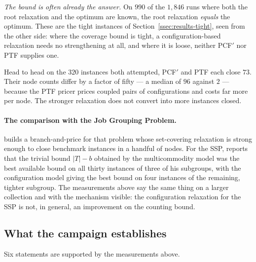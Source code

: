\emph{The bound is often already the answer.} On $990$ of the $1{,}846$ runs where both
the root relaxation and the optimum are known, the root relaxation \emph{equals} the
optimum. These are the tight instances of Section~\ref{ssec:results-tight}, seen from
the other side: where the coverage bound is tight, a configuration-based relaxation
needs no strengthening at all, and where it is loose, neither PCF$'$ nor PTF supplies
one.

Head to head on the $320$ instances both attempted, PCF$'$ and PTF each close $73$.
Their node counts differ by a factor of fifty --- a median of $96$ against $2$ ---
because the PTF pricer prices coupled pairs of configurations and costs far more per
node. The stronger relaxation does not convert into more instances closed.

\paragraph{The comparison with the Job Grouping Problem.}
\citet{Otiai2024} builds a branch-and-price for that problem whose set-covering
relaxation is strong enough to close benchmark instances in a handful of nodes. For the
SSP, \citet{Moreira2026} reports that the trivial bound $\lvert T\rvert-b$ obtained by
the multicommodity model was the best available bound on all thirty instances of three
of his subgroups, with the configuration model giving the best bound on four instances
of the remaining, tighter subgroup. The measurements above say the same thing on a
larger collection and with the mechanism visible: the configuration relaxation for the
SSP is not, in general, an improvement on the counting bound.

\subsection{What the campaign establishes}\label{ssec:results-summary}

Six statements are supported by the measurements above.


